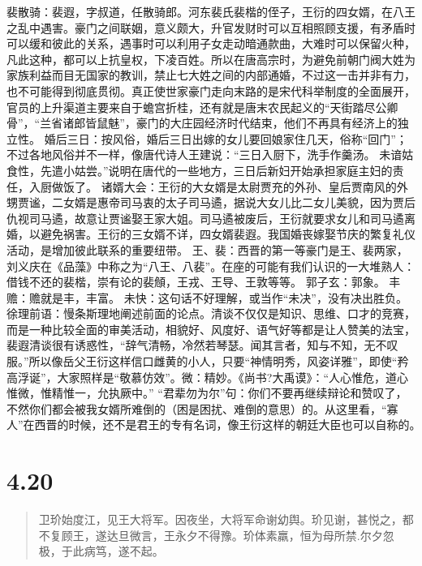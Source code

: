\documentclass[]{book}
\begin{document}
裴散骑：裴遐，字叔道，任散骑郎。河东裴氏裴楷的侄子，王衍的四女婿，在八王之乱中遇害。豪门之间联姻，意义颇大，升官发财时可以互相照顾支援，有矛盾时可以缓和彼此的关系，遇事时可以利用子女走动暗通款曲，大难时可以保留火种，凡此这种，都可以上抗皇权，下凌百姓。所以在唐高宗时，为避免前朝门阀大姓为家族利益而目无国家的教训，禁止七大姓之间的内部通婚，不过这一击并非有力，也不可能得到彻底贯彻。真正使世家豪门走向末路的是宋代科举制度的全面展开，官员的上升渠道主要来自于蟾宫折桂，还有就是唐末农民起义的``天街踏尽公卿骨''，``兰省诸郎皆鼠魅''，豪门的大庄园经济时代结束，他们不再具有经济上的独立性。
婚后三日：按风俗，婚后三日出嫁的女儿要回娘家住几天，俗称``回门''；不过各地风俗并不一样，像唐代诗人王建说：``三日入厨下，洗手作羹汤。
未谙姑食性，先遣小姑尝。''说明在唐代的一些地方，三日后新妇开始承担家庭主妇的责任，入厨做饭了。
诸婿大会：王衍的大女婿是太尉贾充的外孙、皇后贾南风的外甥贾谧，二女婿是惠帝司马衷的太子司马遹，据说大女儿比二女儿美貌，因为贾后仇视司马遹，故意让贾谧娶王家大姐。司马遹被废后，王衍就要求女儿和司马遹离婚，以避免祸害。王衍的三女婿不详，四女婿裴遐。我国婚丧嫁娶节庆的繁复礼仪活动，是增加彼此联系的重要纽带。
王、裴：西晋的第一等豪门是王、裴两家，刘义庆在《品藻》中称之为``八王、八裴''。在座的可能有我们认识的一大堆熟人：借钱不还的裴楷，崇有论的裴頠，王戎、王导、王敦等等。
郭子玄：郭象。 丰赡：赡就是丰，丰富。
未快：这句话不好理解，或当作``未决''，没有决出胜负。
徐理前语：慢条斯理地阐述前面的论点。清谈不仅仅是知识、思维、口才的竞赛，而是一种比较全面的审美活动，相貌好、风度好、语气好等都是让人赞美的法宝，裴遐清谈很有诱惑性，``辞气清畅，冷然若琴瑟。闻其言者，知与不知，无不叹服。''所以像岳父王衍这样信口雌黄的小人，只要``神情明秀，风姿详雅''，即使``矜高浮诞''，大家照样是``敬慕仿效''。微：精妙。《尚书?大禹谟》：``人心惟危，道心惟微，惟精惟一，允执厥中。''
``君辈勿为尔''句：你们不要再继续辩论和赞叹了，不然你们都会被我女婿所难倒的（困是困扰、难倒的意思）的。从这里看，``寡人''在西晋的时候，还不是君王的专有名词，像王衍这样的朝廷大臣也可以自称的。　　

\section{4.20}\label{section-199}

\begin{quote}
卫玠始度江，见王大将军。因夜坐，大将军命谢幼舆。玠见谢，甚悦之，都不复顾王，遂达旦微言，王永夕不得豫。玠体素羸，恒为母所禁.尔夕忽极，于此病笃，遂不起。
\end{quote}
\end{document}
